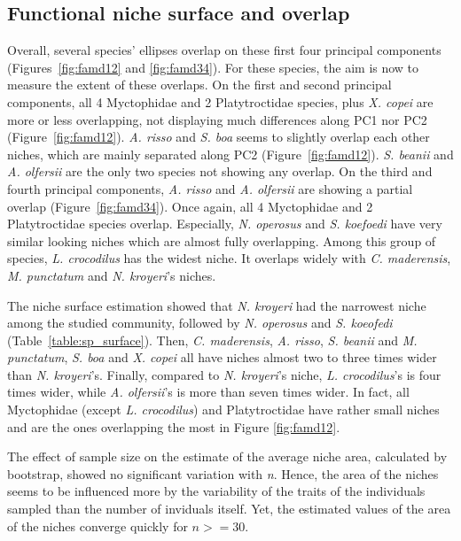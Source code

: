 \subsection{Functional niche surface and overlap}
Overall, several species' ellipses overlap on these first four principal components (Figures~\ref{fig:famd12} and \ref{fig:famd34}). For these species, the aim is now to measure the extent of these overlaps. On the first and second principal components, all 4 Myctophidae and 2 Platytroctidae species, plus \textit{X. copei} are more or less overlapping, not displaying much differences along PC1 nor PC2 (Figure~\ref{fig:famd12}). \textit{A. risso} and \textit{S. boa} seems to slightly overlap each other niches, which are mainly separated along PC2 (Figure~\ref{fig:famd12}). \textit{S. beanii} and \textit{A. olfersii} are the only two species not showing any overlap. 
On the third and fourth principal components, \textit{A. risso} and \textit{A. olfersii} are showing a partial overlap (Figure~\ref{fig:famd34}). Once again, all 4 Myctophidae and 2 Platytroctidae species overlap. Especially, \textit{N. operosus} and \textit{S. koefoedi} have very similar looking niches which are almost fully overlapping. Among this group of species, \textit{L. crocodilus} has the widest niche. It overlaps widely with \textit{C. maderensis}, \textit{M. punctatum} and \textit{N. kroyeri}'s niches. 

The niche surface estimation showed that \textit{N. kroyeri} had the narrowest niche among the studied community, followed by \textit{N. operosus} and \textit{S. koeofedi} (Table~\ref{table:sp_surface}). Then, \textit{C. maderensis}, \textit{A. risso}, \textit{S. beanii} and \textit{M. punctatum}, \textit{S. boa} and \textit{X. copei} all have niches almost two to three times wider than \textit{N. kroyeri}'s. Finally, compared to \textit{N. kroyeri}'s niche, \textit{L. crocodilus}'s is four times wider, while \textit{A. olfersii}'s is more than seven times wider. In fact, all Myctophidae (except \textit{L. crocodilus}) and Platytroctidae have rather small niches and are the ones overlapping the most in Figure \ref{fig:famd12}.

The effect of sample size on the estimate of the average niche area, calculated by bootstrap, showed no significant variation with \textit{n}. Hence, the area of the niches seems to be influenced more by the variability of the traits of the individuals sampled than the number of inviduals itself. Yet, the estimated values of the area of the niches converge quickly for $n >= 30$. 

